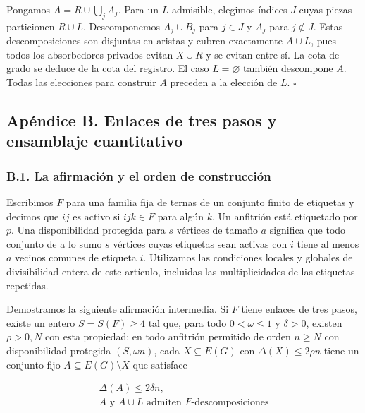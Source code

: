 \documentclass[spanish,11pt,a4paper]{article}
\begin{document}
Pongamos \(A=R\cup\bigcup_j A_j\). Para un \(L\) admisible, elegimos índices \(J\) cuyas piezas particionen \(R\cup L\). Descomponemos \(A_j\cup B_j\) para \(j\in J\) y \(A_j\) para \(j\notin J\). Estas descomposiciones son disjuntas en aristas y cubren exactamente \(A\cup L\), pues todos los absorbedores privados evitan \(X\cup R\) y se evitan entre sí. La cota de grado se deduce de la cota del registro. El caso \(L=\varnothing\) también descompone \(A\). Todas las elecciones para construir \(A\) preceden a la elección de \(L\). \(\square\)

\bigskip

\subsection{Apéndice B. Enlaces de tres pasos y ensamblaje cuantitativo}\label{apuxe9ndice-b.-enlaces-de-tres-pasos-y-ensamblaje-cuantitativo}

\subsubsection{B.1. La afirmación y el orden de construcción}\label{b.1.-la-afirmaciuxf3n-y-el-orden-de-construcciuxf3n}

Escribimos \(F\) para una familia fija de ternas de un conjunto finito de etiquetas y decimos que \(ij\) es activo si \(ijk\in F\) para algún \(k\). Un anfitrión está etiquetado por \(p\). Una disponibilidad protegida para \(s\) vértices de tamaño \(a\) significa que todo conjunto de a lo sumo \(s\) vértices cuyas etiquetas sean activas con \(i\) tiene al menos \(a\) vecinos comunes de etiqueta \(i\). Utilizamos las condiciones locales y globales de divisibilidad entera de este artículo, incluidas las multiplicidades de las etiquetas repetidas.

Demostramos la siguiente afirmación intermedia. Si \(F\) tiene enlaces de tres pasos, existe un entero \(S=S(F)\ge4\) tal que, para todo \(0<\omega\le1\) y \(\delta>0\), existen \(\rho>0,N\) con esta propiedad: en todo anfitrión permitido de orden \(n\ge N\) con disponibilidad protegida \((S,\omega n)\), cada \(X\subseteq E(G)\) con \(\Delta(X)\le2\rho n\) tiene un conjunto fijo \(A\subseteq E(G)\setminus X\) que satisface

\[\begin{gathered}
\Delta(A)\le2\delta n,\\
A\text{ y }A\cup L\text{ admiten }F\text{-descomposiciones}
\end{gathered}
\tag{B.1.1}\]
\end{document}
